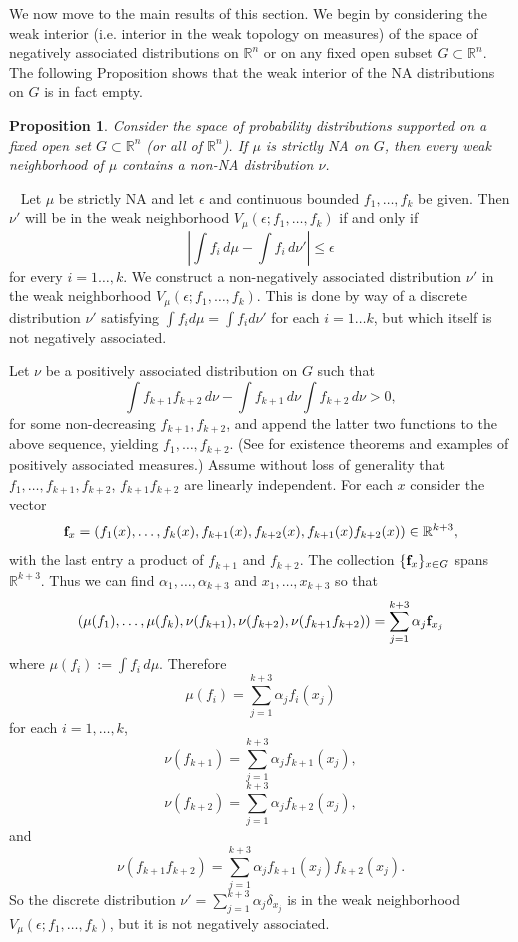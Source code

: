 \documentclass[11pt]{article}
\newcommand{\R}{\mathbb{R}}
\newtheorem{prop}{Proposition}
\newenvironment{Proof}{\noindent{\bf Proof} \ }{\QED}\smallskip
\newcommand\QED{\newline \rightline{$\blacksquare$} \bigskip}
\begin{document}
We now move to the main results of this section. We begin by considering
the weak interior (i.e. interior in the weak topology on measures) of the space of negatively associated distributions on $\R^n$ or on any fixed open subset $G\subset \R^n$. The following Proposition shows that the weak interior of the NA distributions on $G$ is in fact empty.


\begin{prop}\label{empty}
Consider the space of probability distributions supported on a fixed open set $G\subset \R^n$ (or all of $\R^n$).
If $\mu$ is strictly NA on $G$, then every weak neighborhood of $\mu$ contains a non-NA distribution $\nu$.
\end{prop}

\begin{Proof}
Let $\mu$ be strictly NA and let $\epsilon$ and continuous bounded $f_1,\dots, f_k$ be given. Then $\nu'$
will be in the weak neighborhood $V_\mu(\epsilon;f_1,\dots, f_k)$
if and only if 
\[
\left| \int f_i \, d\mu - \int f_i \, d\nu'\right| \leq \epsilon
\]
for every $i=1\dots, k$. %
We construct a non-negatively associated distribution $\nu'$ in the weak neighborhood $V_{\mu}(\epsilon;f_1,\dots,f_k)$. This is done by way of a discrete distribution $\nu'$ satisfying $\int f_i d\mu =\int f_i d\nu'$ for each $i=1\dots k$, but which itself is not negatively associated. 

Let $\nu$ be a positively associated distribution on $G$
such that 
\[
\int f_{k+1}f_{k+2} \, d\nu  - \int f_{k+1}\, d\nu \int f_{k+2} \, d\nu >0,
\]
for some non-decreasing $f_{k+1},f_{k+2}$, and append the latter two functions to the above sequence, yielding $f_1,\ldots,f_{k+2}$. (See \cite{FKG} for existence theorems and examples of positively associated measures.)
Assume without loss of generality that $f_1,\dots,f_{k+1}, f_{k+2}$, $f_{k+1}f_{k+2}$
are linearly independent. For each $x$ consider the vector 
\[
{\bf f}_x=(f_1(x),\dots, f_k(x),f_{k+1}(x),f_{k+2}(x), f_{k+1}(x)f_{k+2}(x)) \in \R^{k+3},
\] 
with the last entry a product of $f_{k+1}$ and $f_{k+2}$. The collection $\{{\bf f}_x\}_{x \in G}$ spans $\R^{k+3}$. 
Thus we can find $\alpha_1,\dots, \alpha_{k+3}$ and $x_1,\dots, x_{k+3}$
so that 
\[
(\mu(f_1),\dots,\mu(f_k), \nu(f_{k+1}), \nu(f_{k+2}),\nu(f_{k+1}f_{k+2})) = \sum_{j=1}^{k+3}\alpha_j{\bf f}_{x_j}
\]
where $\mu(f_i) := \int f_i \, d\mu$. 
Therefore 
\[
\mu(f_i) = \sum_{j=1}^{k+3}\alpha_jf_i(x_j)
\]
 for each $i=1,\dots, k$,
 \[
 \nu(f_{k+1}) = \sum_{j=1}^{k+3} \alpha_j f_{k+1}(x_j),
 \]
  \[
 \nu(f_{k+2}) = \sum_{j=1}^{k+3} \alpha_j f_{k+2}(x_j),
 \]
 and
\[
\nu(f_{k+1}f_{k+2}) = \sum_{j=1}^{k+3} \alpha_j f_{k+1}(x_j)f_{k+2}(x_j).
\]
So the discrete distribution $\nu' = \sum_{j=1}^{k+3} \alpha_j \delta_{x_j}$
is in the weak neighborhood $V_{\mu}(\epsilon ; f_1,\dots, f_k)$, but it is
not negatively associated.
\end{Proof}
\end{document}
